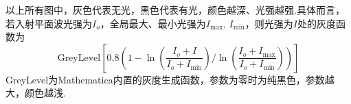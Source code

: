 \begin{notes}
	以上所有图中，灰色代表无光，黑色代表有光，颜色越深、光强越强.具体而言，若入射平面波光强为\(I_o\)，全局最大、最小光强为\(I_{\text{max}},\,I_{\text{min}}\)，则光强为\(I\)处的灰度函数为
	\begin{equation*}
		\text{GreyLevel}\left[0.8\left(1-\ln\left(\frac{I_o+I}{I_o+I_{\text{min}}}\right)/\ln\left(\frac{I_o+I_{\text{max}}}{I_o+I_{\text{min}}}\right)\right)\right]
	\end{equation*}
	GreyLevel为Mathematica内置的灰度生成函数，参数为零时为纯黑色，参数越大，颜色越浅.
\end{notes}


